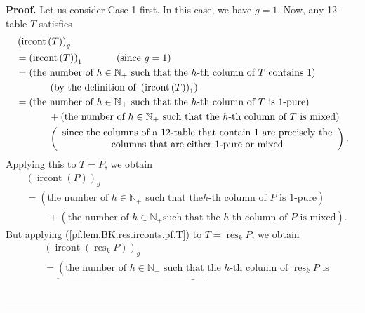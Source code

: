 \documentclass[numbers=enddot,12pt,final,onecolumn,notitlepage]{scrartcl}%
\theoremstyle{definition}
\newenvironment{proof}[1][Proof]{\noindent\textbf{#1.} }{\ \rule{0.5em}{0.5em}}
\begin{document}
\begin{proof}
Let us consider Case 1 first. In this case, we have $g=1$. Now, any 12-table
$T$ satisfies%
\begin{align}
&  \left(  \operatorname*{ircont}\left(  T\right)  \right)  _{g}\nonumber\\
&  =\left(  \operatorname*{ircont}\left(  T\right)  \right)  _{1}%
\ \ \ \ \ \ \ \ \ \ \left(  \text{since }g=1\right) \nonumber\\
&  =\left(  \text{the number of }h\in\mathbb{N}_{+}\text{ such that the
}h\text{-th column of }T\text{ contains }1\right) \nonumber\\
&  \ \ \ \ \ \ \ \ \ \ \left(  \text{by the definition of }\left(
\operatorname*{ircont}\left(  T\right)  \right)  _{1}\right) \nonumber\\
&  =\left(  \text{the number of }h\in\mathbb{N}_{+}\text{ such that the
}h\text{-th column of }T\text{ is 1-pure}\right) \nonumber\\
&  \ \ \ \ \ \ \ \ \ \ +\left(  \text{the number of }h\in\mathbb{N}_{+}\text{
such that the }h\text{-th column of }T\text{ is mixed}\right)
\label{pf.lem.BK.res.irconts.pf.T}\\
&  \ \ \ \ \ \ \ \ \ \ \left(
\begin{array}
[c]{c}%
\text{since the columns of a 12-table that contain }1\text{ are precisely
the}\\
\text{columns that are either 1-pure or mixed}%
\end{array}
\right)  .\nonumber
\end{align}
Applying this to $T=P$, we obtain%
\begin{align}
&  \left(  \operatorname*{ircont}\left(  P\right)  \right)  _{g}\nonumber\\
&  =\left(  \text{the number of }h\in\mathbb{N}_{+}\text{ such that the
}h\text{-th column of }P\text{ is 1-pure}\right) \nonumber\\
&  \ \ \ \ \ \ \ \ \ \ +\left(  \text{the number of }h\in\mathbb{N}_{+}\text{
such that the }h\text{-th column of }P\text{ is mixed}\right)  .
\label{pf.lem.BK.res.irconts.pf.P}%
\end{align}
But applying (\ref{pf.lem.BK.res.irconts.pf.T}) to $T=\operatorname*{res}%
\nolimits_{k}P$, we obtain%
\begin{align*}
&  \left(  \operatorname*{ircont}\left(  \operatorname*{res}\nolimits_{k}%
P\right)  \right)  _{g}\\
&  =\underbrace{\left(  \text{the number of }h\in\mathbb{N}_{+}\text{ such
that the }h\text{-th column of }\operatorname*{res}\nolimits_{k}P\text{ is
}}
\end{align*}
\end{proof}
\end{document}

